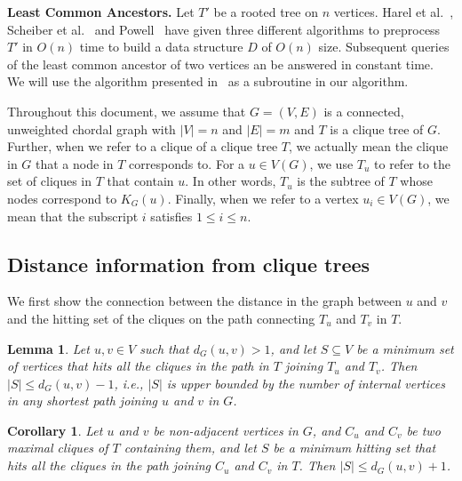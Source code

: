 \documentclass[MS,synopsis]{iitmdiss}
\newtheorem{corollary}[theorem]{Corollary}
\newtheorem{lemma}[theorem]{Lemma}
\begin{document}
 \noindent
{\bf Least Common Ancestors.} Let $T'$ be a rooted tree on $n$ vertices.
Harel et al.~\cite{lcabytarjan}, Scheiber et al.~\cite{lcabyvishkin} and Powell~\cite{lcabypowell} have given
 three different algorithms to preprocess $T'$ in $O(n)$ time to build a data structure $D$ of $O(n)$ size. Subsequent queries of the least common ancestor
 of two vertices an be answered in constant time. We will use the algorithm presented in~\cite{lcabyvishkin} as a subroutine in our algorithm.
 
 Throughout this document, we assume that $G = (V,E)$ is a connected, unweighted chordal graph with $|V| = n$ and $|E| = m$ and $T$ is a 
 clique tree of $G$. Further, when we refer to a clique of a clique tree $T$, we actually mean the clique in $G$ that a node in $T$ corresponds to. 
 For a $u \in V(G)$, we use $T_u$ to refer to the set of cliques in $T$ that contain $u$.  In other words, $T_u$ is the subtree of $T$ whose nodes correspond to $K_G(u)$.
 Finally, when we refer to a vertex $u_i \in V(G)$, we mean that the subscript $i$ satisfies $1 \leq i \leq n$.  
 
 \subsection{Distance information from clique trees}\label{pathinfo}
 We first show the connection between the distance in the graph between $u$ and $v$ and
 the hitting set of the cliques on the path connecting $T_u$ and $T_v$ in $T$.
 
 \begin{lemma} \label{hitsel}
 Let $u,v \in V$ such that $d_G(u,v) > 1$, and let $S \subseteq V$ be a minimum
 set of  vertices that hits  all the cliques in the path in $T$ joining $T_u$ and $T_v$.
 Then $|S| \leq d_G(u,v)-1$, i.e., $|S|$ is upper bounded by the number of internal vertices
 in any shortest path joining $u$ and $v$ in $G$. 
\end{lemma}

 \begin{corollary} \label{hitselany}
 Let $u$ and $v$ be non-adjacent vertices in $G$, and $C_u$ and $C_v$ be two maximal cliques of $T$
 containing them, and let $S$ be a minimum hitting set that hits all the cliques in the path joining $C_u$ and
 $C_v$ in $T$. Then $|S| \leq d_G(u,v)+1$.
 \end{corollary}
\end{document}
